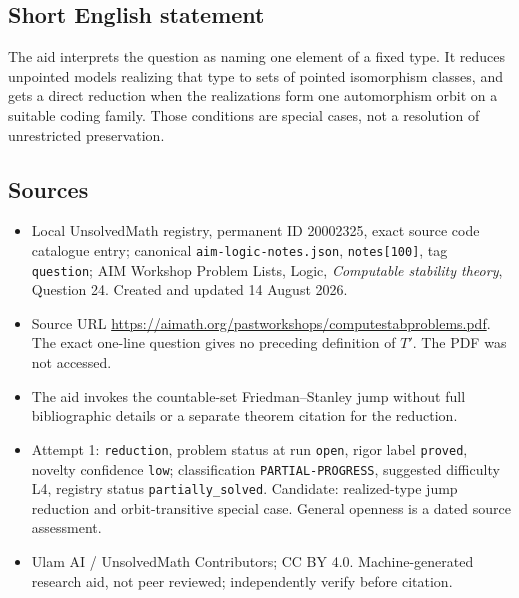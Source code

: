 \documentclass[11pt]{article}
\begin{document}
\subsection{Short English statement}
The aid interprets the question as naming one element of a fixed type. It reduces unpointed models realizing that type to sets of pointed isomorphism classes, and gets a direct reduction when the realizations form one automorphism orbit on a suitable coding family. Those conditions are special cases, not a resolution of unrestricted preservation.
\subsection{Sources}
\begin{itemize}
\item Local UnsolvedMath registry, permanent ID 20002325, exact source code catalogue entry; canonical \texttt{aim-logic-notes.json}, \texttt{notes[100]}, tag \texttt{question}; AIM Workshop Problem Lists, Logic, \emph{Computable stability theory}, Question 24. Created and updated 14 August 2026.
\item Source URL \url{https://aimath.org/pastworkshops/computestabproblems.pdf}. The exact one-line question gives no preceding definition of \(T'\). The PDF was not accessed.
\item The aid invokes the countable-set Friedman--Stanley jump without full bibliographic details or a separate theorem citation for the reduction.
\item Attempt 1: \texttt{reduction}, problem status at run \texttt{open}, rigor label \texttt{proved}, novelty confidence \texttt{low}; classification \texttt{PARTIAL-PROGRESS}, suggested difficulty L4, registry status \texttt{partially\_solved}. Candidate: realized-type jump reduction and orbit-transitive special case. General openness is a dated source assessment.
\item Ulam AI / UnsolvedMath Contributors; CC BY 4.0. Machine-generated research aid, not peer reviewed; independently verify before citation.
\end{itemize}
\end{document}
